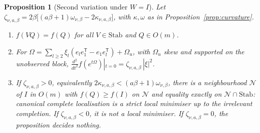 \documentclass[11pt,a4paper]{article}
\numberwithin{equation}{section}
\newtheorem{proposition}[theorem]{Proposition}
\theoremstyle{remark}\newtheorem{remark}[theorem]{Remark}
\newcommand{\T}{^{\mathsf T}}
\begin{document}
\begin{proposition}[Second variation under \(W=I\)]\label{prop:WI}
Let \(\zeta_{\nu,a,\beta}=2\beta\bigl[(a\beta+1)\omega_{\nu,\beta}-2\kappa_{\nu,a,\beta}\bigr]\), with
\(\kappa,\omega\) as in Proposition~\ref{prop:curvature}.
\begin{enumerate}
\item \(f(VQ)=f(Q)\) for all \(V\in\mathrm{Stab}\) and \(Q\in O(m)\).
\item For \(\Omega=\sum_{l\ge2}\xi_l(e_le_1\T-e_1e_l\T)+\Omega_u\), with \(\Omega_u\) skew and
 supported on the unobserved block,
 \(\frac{d^2}{dt^2}f(e^{t\Omega})|_{t=0}=\zeta_{\nu,a,\beta}\,|\xi|^2\).
\item If \(\zeta_{\nu,a,\beta}>0\), equivalently \(2\kappa_{\nu,a,\beta}<(a\beta+1)\omega_{\nu,\beta}\),
 there is a neighbourhood \(\mathcal N\) of \(I\) in \(O(m)\) with \(f(Q)\ge f(I)\) on \(\mathcal N\) and
 equality exactly on \(\mathcal N\cap\mathrm{Stab}\): canonical complete localisation is a strict
 local minimiser up to the irrelevant completion. If \(\zeta_{\nu,a,\beta}<0\), it is not a local
 minimiser. If \(\zeta_{\nu,a,\beta}=0\), the proposition decides nothing.
\end{enumerate}
\end{proposition}
\end{document}
